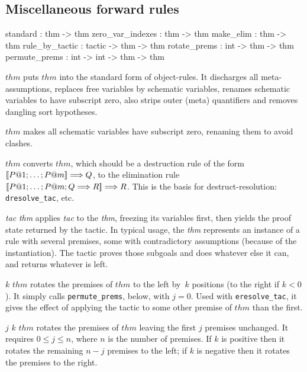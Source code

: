 \subsection{Miscellaneous forward rules}\label{MiscellaneousForwardRules}
\begin{ttbox} 
standard         :               thm -> thm
zero_var_indexes :               thm -> thm
make_elim        :               thm -> thm
rule_by_tactic   :     tactic -> thm -> thm
rotate_prems     :        int -> thm -> thm
permute_prems    : int -> int -> thm -> thm
\end{ttbox}
\begin{ttdescription}
\item[\ttindexbold{standard} $thm$] puts $thm$ into the standard form
  of object-rules.  It discharges all meta-assumptions, replaces free
  variables by schematic variables, renames schematic variables to
  have subscript zero, also strips outer (meta) quantifiers and
  removes dangling sort hypotheses.

\item[\ttindexbold{zero_var_indexes} $thm$] 
makes all schematic variables have subscript zero, renaming them to avoid
clashes. 

\item[\ttindexbold{make_elim} $thm$] 
converts $thm$, which should be  a destruction rule of the form
$\mathopen{[\![} P@1;\ldots;P@m\mathclose{]\!]}\Longrightarrow 
Q$, to the elimination rule $\mathopen{[\![} P@1; \ldots; P@m; Q\Longrightarrow R\mathclose{]\!]}\Longrightarrow R$.  This
is the basis for destruct-resolution: {\tt dresolve_tac}, etc.

\item[\ttindexbold{rule_by_tactic} {\it tac} {\it thm}] 
  applies {\it tac\/} to the {\it thm}, freezing its variables first, then
  yields the proof state returned by the tactic.  In typical usage, the
  {\it thm\/} represents an instance of a rule with several premises, some
  with contradictory assumptions (because of the instantiation).  The
  tactic proves those subgoals and does whatever else it can, and returns
  whatever is left.
  
\item[\ttindexbold{rotate_prems} $k$ $thm$] rotates the premises of $thm$ to
  the left by~$k$ positions (to the right if $k<0$).  It simply calls
  \texttt{permute_prems}, below, with $j=0$.  Used with
  \texttt{eresolve_tac}, it
  gives the effect of applying the tactic to some other premise of $thm$ than
  the first.

\item[\ttindexbold{permute_prems} $j$ $k$ $thm$] rotates the premises of $thm$
  leaving the first $j$ premises unchanged.  It
  requires $0\leq j\leq n$, where $n$ is the number of premises.  If $k$ is
  positive then it rotates the remaining $n-j$ premises to the left; if $k$ is
  negative then it rotates the premises to the right.
\end{ttdescription}


